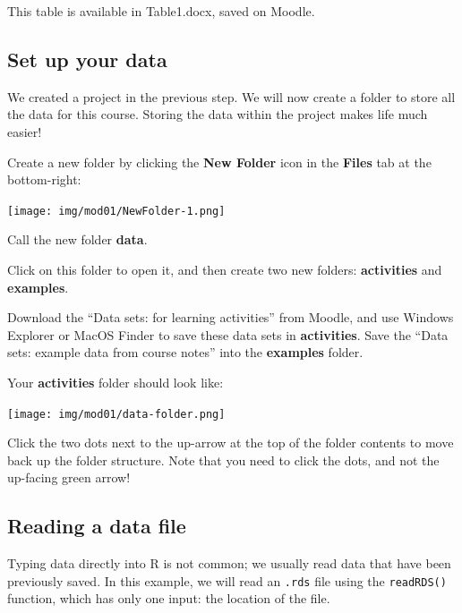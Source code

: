 \documentclass[
  a4paper,
]{memoir}
\begin{document}
This table is available in Table1.docx, saved on Moodle.

\hypertarget{set-up-your-data}{%
\subsection{Set up your data}\label{set-up-your-data}}

We created a project in the previous step. We will now create a folder
to store all the data for this course. Storing the data within the
project makes life much easier!

Create a new folder by clicking the \textbf{New Folder} icon in the
\textbf{Files} tab at the bottom-right:

\texttt{[image: img/mod01/NewFolder-1.png]}

Call the new folder \textbf{data}.

Click on this folder to open it, and then create two new folders:
\textbf{activities} and \textbf{examples}.

Download the ``Data sets: for learning activities'' from Moodle, and use
Windows Explorer or MacOS Finder to save these data sets in
\textbf{activities}. Save the ``Data sets: example data from course
notes'' into the \textbf{examples} folder.

Your \textbf{activities} folder should look like:

\texttt{[image: img/mod01/data-folder.png]}

Click the two dots next to the up-arrow at the top of the folder
contents to move back up the folder structure. Note that you need to
click the dots, and not the up-facing green arrow!

\hypertarget{reading-a-data-file}{%
\subsection{Reading a data file}\label{reading-a-data-file}}

Typing data directly into R is not common; we usually read data that
have been previously saved. In this example, we will read an
\texttt{.rds} file using the \texttt{readRDS()} function, which has only
one input: the location of the file.
\end{document}
